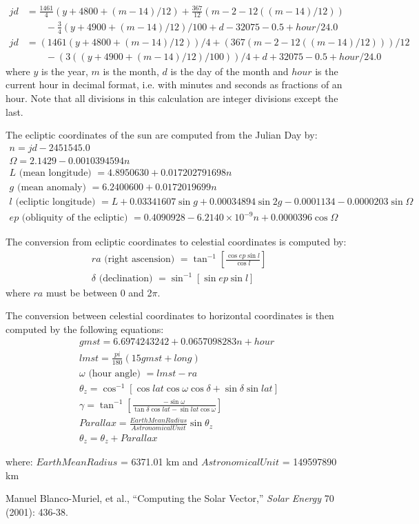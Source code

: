 { %
%
\begin{align*}
jd &= \frac{1461}{4} (y + 4800 + (m - 14)/12) + \frac{367}{12} (m - 2 - 12 ((m - 14)/12)) \\
    & \qquad {} - \frac{3}{4} (y + 4900 + (m - 14) / 12) /100 + d - 32075 - 0.5 + hour/24.0\\
jd &= (1461 (y + 4800 + (m - 14) / 12))/4 + (367 (m - 2 - 12 ((m - 14) / 12)))/12 \\
     & \qquad {} - (3 ((y + 4900 + (m - 14) / 12) / 100 )) / 4 + d + 32075 - 0.5 + hour/24.0
\end{align*}
where $y$ is the year, $m$ is the month, $d$ is the day of the month and $hour$ is the current hour
in decimal format, i.e. with minutes and seconds as fractions of an hour. Note that all divisions 
in this calculation are integer divisions except the last.

The ecliptic coordinates of the sun are computed from the Julian Day by:
%
\begin{gather*}
n = jd - 2451545.0 \\
\Omega = 2.1429 - 0.0010394594 n \\
L \text{ (mean longitude) } = 4.8950630 + 0.017202791698 n \\ 
g \text{ (mean anomaly) } = 6.2400600 + 0.0172019699 n \\
l \text{ (ecliptic longitude) } = L + 0.03341607 \sin{g} + 0.00034894 \sin{2 g} - 0.0001134 - 0.0000203 \sin{\Omega} \\
ep \text{ (obliquity of the ecliptic) } = 0.4090928 - 6.2140 \times 10^{-9} n + 0.0000396 \cos{\Omega}
\end{gather*}


The conversion from ecliptic coordinates to celestial coordinates is computed by:
\begin{gather*}
 ra \text{ (right ascension) }= \tan^{-1} \left[ \frac{\cos{ep} \sin{l}}{\cos{l}} \right] \\
\delta \text{ (declination) }= \sin^{-1} [\sin{ep} \sin{l}]
\end{gather*}
where $ra$ must be between 0 and 2$\pi$. 

The conversion between celestial coordinates to horizontal coordinates is then computed by the 
following equations:
\begin{gather*}
 gmst = 6.6974243242 + 0.0657098283 n + hour \\
lmst = \frac{pi}{180} (15 gmst + long) \\
\omega \text{ (hour angle) }= lmst - ra \\
\theta_z = \cos^{-1} [ \cos{lat} \cos{\omega} \cos{\delta} + \sin{\delta} \sin{lat}] \\
\gamma = \tan^{-1} \left[ \frac{ - \sin{\omega}}{\tan{\delta} \cos{lat} - \sin{lat} \cos{\omega}} \right] \\
Parallax = \frac{EarthMeanRadius}{AstronomicalUnit} \sin{\theta_z} \\
\theta_z = \theta_z + Parallax
\end{gather*}

where: $EarthMeanRadius$ = 6371.01 km and $AstronomicalUnit$ = 149597890 km
 
}
{ %

}
{ %
Manuel Blanco-Muriel, et al., ``Computing the Solar Vector,'' \emph{Solar Energy} 70 (2001): 436-38.
\cite{Blanco} 
}


